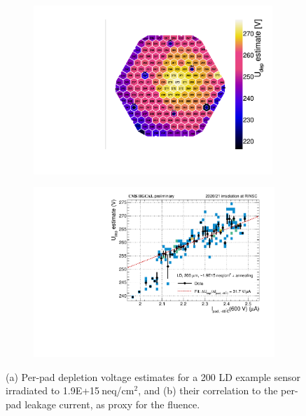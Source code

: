 \begin{figure}
	\captionsetup[subfigure]{aboveskip=-1pt,belowskip=-1pt}
	\centering
	\begin{subfigure}[b]{0.49\textwidth}
		\centering
		\includegraphics[width=0.99\textwidth]{plots/Vdep_hexplots/0541_04.pdf}
		\subcaption{
			}
			\label{plot:Vdep_hexplot_0541_04}
	\end{subfigure}
	\hfill
	\begin{subfigure}[b]{0.49\textwidth}
		\centering
		\includegraphics[width=0.999\textwidth]{plots/Vdep_vs_fluence/Vdep_vs_current_5414.pdf}
		\subcaption{
			}
			\label{plot:Vdep_vs_current_5414}
	\end{subfigure}
	\caption{
		(a) Per-pad depletion voltage estimates for a \SI{200}{\micron} LD example sensor irradiated to 1.9E+15$~$neq/cm$^{2}$, and 
		(b) their correlation to the per-pad leakage current, as proxy for the fluence.
	}
\end{figure}
